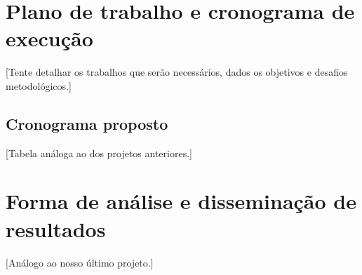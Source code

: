 \documentclass[12pt]{article}
\begin{document}

\section{Plano de trabalho e cronograma de execução}

{\color{blue}[Tente detalhar os trabalhos que serão necessários, dados os objetivos e desafios metodológicos.]}

\subsection{Cronograma proposto}

{\color{blue}[Tabela análoga ao dos projetos anteriores.]}


\section{Forma de análise e disseminação de resultados}

{\color{blue}[Análogo ao nosso último projeto.]}


 

\end{document}
